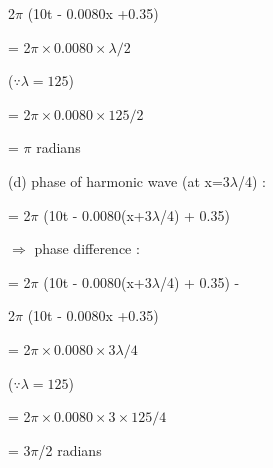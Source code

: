 \documentclass[journal,12pt,twocolumn]{IEEEtran}
\theoremstyle{remark}
\begin{document}
2$\pi$ (10t - 0.0080x  +0.35)

= 2$\pi \times 0.0080 \times \lambda/2$

($\because \lambda = 125$)

= 2$\pi \times 0.0080 \times 125/2$

= $\pi$ radians

\vspace{0.5cm}
(d) phase of harmonic wave (at x=$3\lambda$/4) :

= 2$\pi$ (10t - 0.0080(x+$3\lambda$/4) + 0.35)

$\Rightarrow$  phase difference :

= 2$\pi$ (10t - 0.0080(x+$3\lambda$/4) + 0.35) -

2$\pi$ (10t - 0.0080x  +0.35)

= 2$\pi \times 0.0080 \times 3\lambda/4$

($\because \lambda = 125$)

= 2$\pi \times 0.0080 \times 3 \times125/4$

= $3\pi$/2 radians
\end{document}
